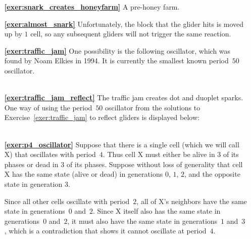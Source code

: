\begin{multicols}{2}
\begin{itemize}[leftmargin=0em]
\begin{enumerate}[leftmargin=1.5em,label=\bf\color{ocre}(\alph*)]
			\item {} \\
		\end{enumerate}
		
		
		\item[\bf\color{ocre}\sffamily\ref{exer:snark_creates_honeyfarm}] A pre-honey farm. \\
		
		
		\item[\bf\color{ocre}\sffamily\ref{exer:almost_snark}] Unfortunately, the block that the glider hits is moved up by $1$ cell, so any subsequent gliders will not trigger the same reaction. \\
		
		
		\item[\bf\color{ocre}\sffamily\ref{exer:traffic_jam}] One possibility is the following oscillator, which was found by Noam Elkies in 1994. It is currently the smallest known period~$50$ oscillator. \\[-0.6em]
		
		 \\
		
		
		\item[\bf\color{ocre}\sffamily\ref{exer:traffic_jam_reflect}] The traffic jam creates dot and duoplet sparks. One way of using the period~$50$ oscillator from the solutions to Exercise~\ref{exer:traffic_jam} to reflect gliders is displayed below: \\[-0.6em]
		
		 \\
		
		
		\item[\bf\color{ocre}\sffamily\ref{exer:p4_oscillator}] Suppose that there is a single cell (which we will call X) that oscillates with period~$4$. Thus cell X must either be alive in $3$ of its phases or dead in $3$ of its phases. Suppose without loss of generality that cell X has the same state (alive or dead) in generations $0$, $1$, $2$, and the opposite state in generation $3$.
		
		Since all other cells oscillate with period~$2$, all of X's neighbors have the same state in generations~$0$ and~$2$. Since X itself also has the same state in generations~$0$ and~$2$, it must also have the same state in generations~$1$ and~$3$, which is a contradiction that shows it cannot oscillate at period~$4$. \\
		

\end{itemize}
\end{multicols}
